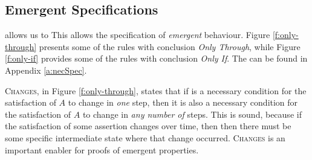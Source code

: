 \subsection{Emergent \Nec Specifications}
\label{s:emergent-proof}

 allows us to
This allows the specification
of \emph{emergent} behaviour. Figure \ref{f:only-through}  {presents} some of the rules with conclusion \emph{Only Through}, while Figure \ref{f:only-if}
provides some of the rules with conclusion \emph{Only If}. 
The  can be found in Appendix \ref{a:necSpec}.


\textsc{Changes}, in Figure \ref{f:only-through}, 
{states that 
if    is a necessary condition for the satisfaction of $A$ to change  in \emph{one} step, then
it is also a  necessary condition for the satisfaction of $A$ to change  in \emph{any number of} steps.
This is sound, because if  the satisfaction of some assertion changes over time, then 
then there must be some specific intermediate state where that change occurred.}
 \textsc{Changes} is an important %
 enabler for
 proofs of 
emergent properties.

